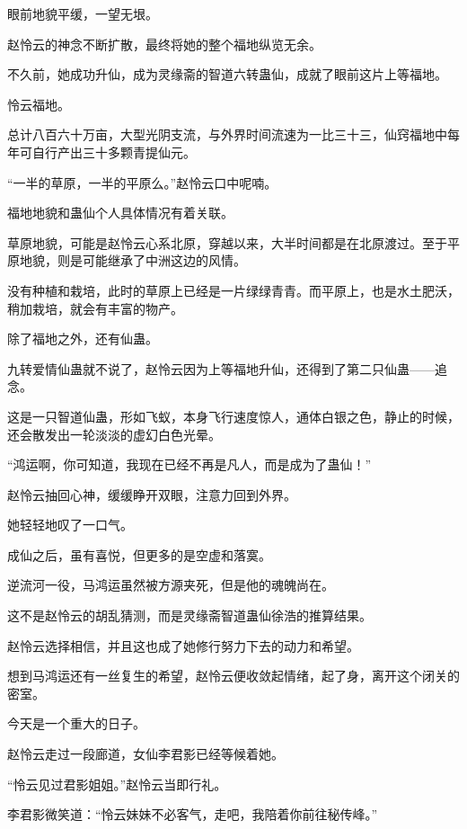 
\begin{this_body}

眼前地貌平缓，一望无垠。

赵怜云的神念不断扩散，最终将她的整个福地纵览无余。

不久前，她成功升仙，成为灵缘斋的智道六转蛊仙，成就了眼前这片上等福地。

怜云福地。

总计八百六十万亩，大型光阴支流，与外界时间流速为一比三十三，仙窍福地中每年可自行产出三十多颗青提仙元。

“一半的草原，一半的平原么。”赵怜云口中呢喃。

福地地貌和蛊仙个人具体情况有着关联。

草原地貌，可能是赵怜云心系北原，穿越以来，大半时间都是在北原渡过。至于平原地貌，则是可能继承了中洲这边的风情。

没有种植和栽培，此时的草原上已经是一片绿绿青青。而平原上，也是水土肥沃，稍加栽培，就会有丰富的物产。

除了福地之外，还有仙蛊。

九转爱情仙蛊就不说了，赵怜云因为上等福地升仙，还得到了第二只仙蛊——追念。

这是一只智道仙蛊，形如飞蚁，本身飞行速度惊人，通体白银之色，静止的时候，还会散发出一轮淡淡的虚幻白色光晕。

“鸿运啊，你可知道，我现在已经不再是凡人，而是成为了蛊仙！”

赵怜云抽回心神，缓缓睁开双眼，注意力回到外界。

她轻轻地叹了一口气。

成仙之后，虽有喜悦，但更多的是空虚和落寞。

逆流河一役，马鸿运虽然被方源夹死，但是他的魂魄尚在。

这不是赵怜云的胡乱猜测，而是灵缘斋智道蛊仙徐浩的推算结果。

赵怜云选择相信，并且这也成了她修行努力下去的动力和希望。

想到马鸿运还有一丝复生的希望，赵怜云便收敛起情绪，起了身，离开这个闭关的密室。

今天是一个重大的日子。

赵怜云走过一段廊道，女仙李君影已经等候着她。

“怜云见过君影姐姐。”赵怜云当即行礼。

李君影微笑道：“怜云妹妹不必客气，走吧，我陪着你前往秘传峰。”


\end{this_body}
